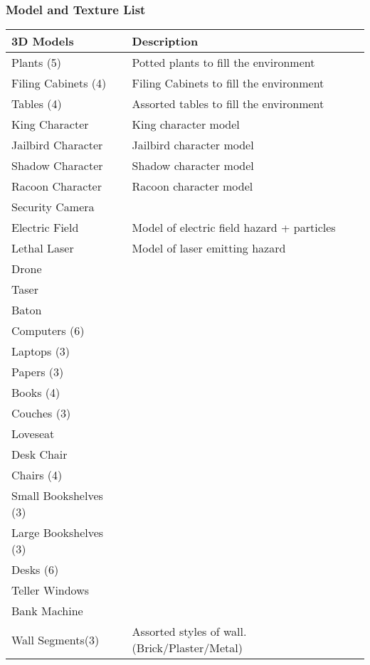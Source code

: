 \documentclass[11pt]{report}
\begin{document}
\subsubsection{Model and Texture List}

\begin{center}
    \begin{tabular}{| p{.45\linewidth} | p{.45\linewidth} |}
        \hline    
        3D Models   & Description  \\ \hline
        Plants (5)  &   Potted plants to fill the environment \\ \hline
        Filing Cabinets (4) &  Filing Cabinets to fill the environment \\ \hline
        Tables (4)  &  Assorted tables to fill the environment \\ \hline
        King Character  &  King character model \\ \hline
        Jailbird Character  &  Jailbird character model \\ \hline
        Shadow Character    &  Shadow character model \\ \hline
        Racoon Character    &  Racoon character model \\ \hline
        Security Camera &   \\ \hline
        Electric Field  &  Model of electric field hazard + particles \\ \hline
        Lethal Laser    &  Model of laser emitting hazard \\ \hline
        Drone   &  \\ \hline
        Taser   &  \\ \hline
        Baton   &  \\ \hline
        Computers (6)   &  \\ \hline
        Laptops (3) &  \\ \hline
        Papers (3)  &  \\ \hline
        Books (4)   &  \\ \hline
        Couches (3)  &  \\ \hline
        Loveseat    &  \\ \hline
        Desk Chair  &  \\ \hline
        Chairs (4)  &  \\ \hline
        Small Bookshelves (3)   &  \\ \hline
        Large Bookshelves (3)   &  \\ \hline
        Desks (6)   &  \\ \hline
        Teller Windows  &  \\ \hline
        Bank Machine    &  \\ \hline
        Wall Segments(3)    & Assorted styles of wall. (Brick/Plaster/Metal) \\
        \hline
    \end{tabular}
\end{center}
    
\end{document}
